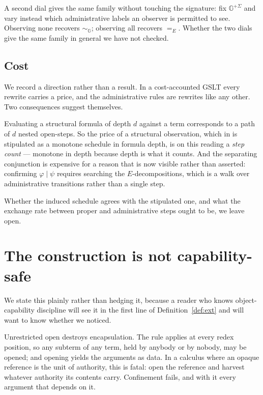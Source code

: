 \documentclass[11pt]{article}
\theoremstyle{plain}
\theoremstyle{definition}
\newcommand{\Gg}{\mathbb{G}}
\newcommand{\op}{\mathrm{open}}
\newcommand{\bis}{\sim}
\begin{document}
A second dial gives the same family without touching the signature: fix $\Gg^{+\Sigma}$ and vary
instead which administrative labels an observer is permitted to see. Observing none recovers
$\bis_\Gg$; observing all recovers $=_E$. Whether the two dials give the same family in general we
have not checked.

\subsection{Cost}
\label{sec:cost}

We record a direction rather than a result. In a cost-accounted GSLT \cite{CostMonad} every rewrite
carries a price, and the administrative rules are rewrites like any other. Two consequences suggest
themselves.

Evaluating a structural formula of depth $d$ against a term corresponds to a path of $d$ nested
$\op$-steps. So the price of a structural observation, which in \cite{ScientistNote} is stipulated as a
monotone schedule in formula depth, is on this reading a \emph{step count} --- monotone in depth
because depth is what it counts. And the separating conjunction is expensive for a reason that is now
visible rather than asserted: confirming $\varphi \mid \psi$ requires searching the
$E$-decompositions, which is a walk over administrative transitions rather than a single step.

Whether the induced schedule agrees with the stipulated one, and what the exchange rate between proper
and administrative steps ought to be, we leave open.

\section{The construction is not capability-safe}
\label{sec:security}

We state this plainly rather than hedging it, because a reader who knows object-capability discipline
will see it in the first line of Definition~\ref{def:ext} and will want to know whether we noticed.

Unrestricted $\op$ destroys encapsulation. The rule applies at every redex position, so any subterm of
any term, held by anybody or by nobody, may be opened; and opening yields the arguments as data. In a
calculus where an opaque reference is the unit of authority, this is fatal: open the reference and
harvest whatever authority its contents carry. Confinement fails, and with it every argument that
depends on it.
\end{document}
